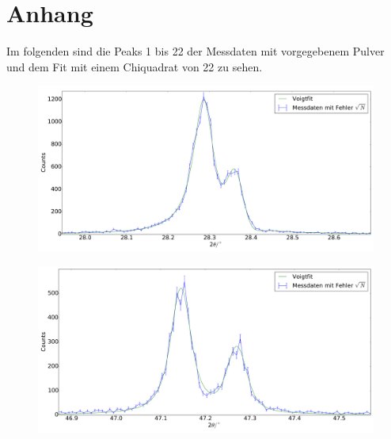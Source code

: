 \section{Anhang}
Im folgenden sind die Peaks 1 bis 22 der Messdaten mit vorgegebenem Pulver und dem Fit mit einem Chiquadrat von 22 zu sehen.
\begin{figure}[H]
\begin{minipage}{.5\textwidth}
  \centering
  \includegraphics[scale=0.15]{messung_pulver_1}
  \label{fig:pul_mess_1}
\end{minipage}
\hspace{0.5cm}
\begin{minipage}{.5\textwidth}
  \centering
  \includegraphics[scale=0.15]{messung_pulver_2}
  \label{fig:pul_mess_2}
\end{minipage}
\end{figure}
